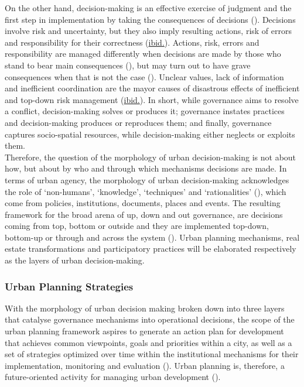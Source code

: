 \documentclass[11pt]{report}
\begin{document}
{{{On the other hand, decision-making is an effective exercise of judgment and the first step in implementation by taking the consequences of decisions (\href{Knight}{\citealt{knight_risk_2012}}).
Decisions involve risk and uncertainty, but they also imply resulting actions, risk of errors and responsibility for their correctness (\href{Knight}{ibid.}).
Actions, risk, errors and responsibility are managed differently when decisions are made by those who stand to bear main consequences (\href{Meppem}{\citealt{meppem_planning_1998}}), but may turn out to have grave consequences when that is not the case (\href{Friend}{\citealt{friend_planning_2005}}).  Unclear values, lack of information and inefficient coordination are the mayor causes of disastrous effects of inefficient and top-down risk management (\href{Friend}{ibid.}).
In short, while governance aims to resolve a conflict, decision-making solves or produces it; governance instates practices and decision-making produces or reproduces them; and finally, governance captures socio-spatial resources, while decision-making either neglects or exploits them.
\\

Therefore, the question of the morphology of urban decision-making is not about how, but about by who and through which mechanisms decisions are made.
In terms of urban agency, the morphology of urban decision-making acknowledges the role of ‘non-humans’, ‘knowledge’, ‘techniques’ and ‘rationalities’ (\href{Healey}{\citealt{healey_circuits_2013}}), which come from policies, institutions, documents, places and events.
The resulting framework for the broad arena of up, down and out governance, are decisions coming from top, bottom or outside and they are implemented top-down, bottom-up or through and across the system
(\href{Hudson}{\citealt{hudson_political_2014}}).
Urban planning mechanisms, real estate transformations and participatory practices will be elaborated respectively as the layers of urban decision-making.

\subsubsection{Urban Planning Strategies}

With the morphology of urban decision making broken down into three layers that catalyse governance mechanisms into operational decisions, the scope of the urban  planning  framework aspires  to  generate  an  action  plan  for  development  that  achieves  common viewpoints,  goals  and  priorities  within  a city,  as  well  as  a  set  of  strategies  optimized  over  time  within  the institutional mechanisms for their implementation, monitoring and evaluation (\href{Fisher}{\citealt{fisher_building_2001}}).
Urban planning is, therefore, a future-oriented activity for managing urban development (\href{Nedovic}{\citealt{nedovic-budic_mornings_2011}}). 
\\

}}}
\end{document}
